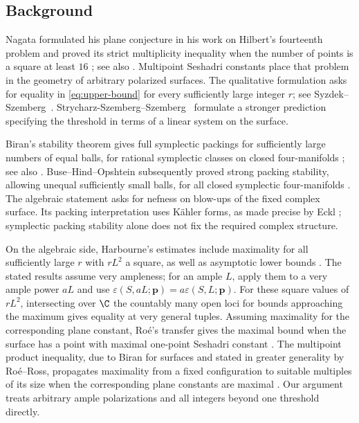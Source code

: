\subsection{Background}

Nagata formulated his plane conjecture in his work on Hilbert's
fourteenth problem and proved its strict multiplicity inequality when the
number of points is a square at least $16$
\cite{Nagata1959}; see also \cite[Chapter~III, Section~1, Proposition~1]{Nagata1965}. Multipoint Seshadri constants place that
problem in the geometry of arbitrary polarized surfaces. The qualitative
formulation asks for equality in \eqref{eq:upper-bound} for every
sufficiently large integer $r$; see
Syzdek--Szemberg~\cite[Conjecture~4.3]{SyzdekSzemberg2010}.
Strycharz-Szemberg--Szemberg~\cite[Conjecture~2.1]{StrycharzSzemberg2004}
formulate a stronger prediction specifying the threshold in terms of a
linear system on the surface.

Biran's stability theorem gives full symplectic packings for sufficiently
large numbers of equal balls, for rational symplectic classes on closed
four-manifolds \cite{Biran1999}; see also
\cite[Theorem~6.3]{Biran2001}. Buse--Hind--Opshtein subsequently proved
strong packing stability, allowing unequal sufficiently small balls, for
all closed symplectic four-manifolds
\cite[Theorem~1]{BuseHindOpshtein2016}. The algebraic statement asks for
nefness on blow-ups of the fixed complex surface. Its packing interpretation
uses K\"ahler forms, as made precise by
Eckl \cite[Theorem~0.5]{Eckl2017}; symplectic packing stability alone
does not fix the required complex structure.

On the algebraic side, Harbourne's estimates include maximality for all
sufficiently large $r$ with $rL^2$ a square, as well as asymptotic lower
bounds \cite[Theorem~I.1 and Proposition~I.2]{Harbourne2003}. The stated
results assume very ampleness; for an ample $L$, apply them to a very ample
power $aL$ and use $\varepsilon(S,aL;\mathbf p)=a\varepsilon(S,L;\mathbf p)$.
For these square values of $rL^2$, intersecting over $\C$ the countably
many open loci for bounds approaching the maximum gives equality at very
general tuples.
Assuming maximality for the corresponding plane constant, Ro\'e's transfer
gives the maximal bound when the surface
has a point with maximal one-point Seshadri constant
\cite[Theorem~3 and Corollary~7]{Roe2004}.
The multipoint product inequality, due to Biran for surfaces and stated
in greater generality by Ro\'e--Ross, propagates maximality from a fixed
configuration to suitable multiples of its size when the corresponding
plane constants are maximal
\cite[Theorem~1.1 and Remark~1.2]{RoeRoss2009}.
Our argument treats arbitrary ample polarizations and all integers beyond
one threshold directly.

